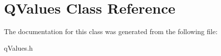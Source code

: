 \hypertarget{class_q_values}{}\section{Q\+Values Class Reference}
\label{class_q_values}


The documentation for this class was generated from the following file\+:\begin{DoxyCompactItemize}
\item 
q\+Values.\+h\end{DoxyCompactItemize}
